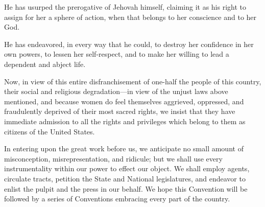 He has usurped the prerogative of Jehovah himself, claiming it as his
right to assign for her a sphere of action, when that belongs to her
conscience and to her God.

He has endeavored, in every way that he could, to destroy her
confidence in her own powers, to lessen her self-respect, and to make
her willing to lead a dependent and abject life.

Now, in view of this entire disfranchisement of one-half the people of
this country, their social and religious degradation---in view of the
unjust laws above mentioned, and because women do feel themselves
aggrieved, oppressed, and fraudulently deprived of their most sacred
rights, we insist that they have immediate admission to all the rights
and privileges which belong to them as citizens of the United States.

In entering upon the great work before us, we anticipate no small
amount of misconception, misrepresentation, and ridicule; but we shall
use every instrumentality within our power to effect our object. We
shall employ agents, circulate tracts, petition the State and National
legislatures, and endeavor to enlist the pulpit and the press in our
behalf. We hope this Convention will be followed by a series of
Conventions embracing every part of the country.

